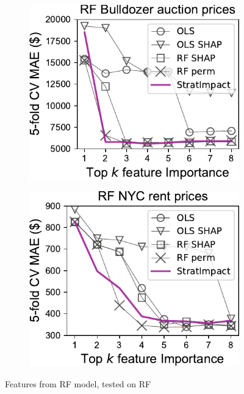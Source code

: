 \documentclass[11pt]{article}
\begin{document}
\begin{figure}
\begin{subfigure}{.245\textwidth}
\end{subfigure}
\hfill
\begin{subfigure}{.245\textwidth}
    \centering
\includegraphics[scale=0.45]{images/bulldozer-topk-RF-Importance.pdf}
\end{subfigure}%
\hfill
\begin{subfigure}{.245\textwidth}
    \centering
\includegraphics[scale=0.45]{images/rent-topk-RF-Importance.pdf}
\end{subfigure}
\caption[short]{Features from RF model, tested on RF}
\label{fig:topk}
\end{figure}
\end{document}
